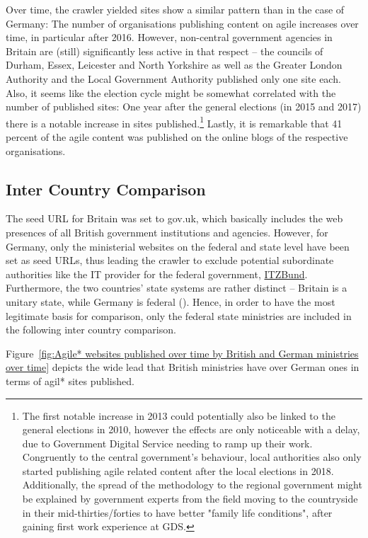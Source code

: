 Over time, the crawler yielded sites show a similar pattern than in the case of Germany: The number of organisations publishing content on agile increases over time, in particular after 2016. However, non-central government agencies in Britain are (still) significantly less active in that respect – the councils of Durham, Essex, Leicester and North Yorkshire as well as the Greater London Authority and the Local Government Authority published only one site each. Also, it seems like the election cycle might be somewhat correlated with the number of published sites: One year after the general elections (in 2015 and 2017) there is a notable increase in sites published.\footnote{The first notable increase in 2013 could potentially also be linked to the general elections in 2010, however the effects are only noticeable with a delay, due to Government Digital Service needing to ramp up their work. Congruently to the central government's behaviour, local authorities also only started publishing agile related content after the local elections in 2018. Additionally, the spread of the methodology to the regional government might be explained by government experts from the field moving to the countryside in their mid-thirties/forties to have better "family life conditions", after gaining first work experience at GDS.} Lastly, it is remarkable that 41 percent of the agile content was published on the online blogs of the respective organisations.

\subsection{Inter Country Comparison} 
The seed URL for Britain was set to gov.uk, which basically includes the web presences of all British government institutions and agencies. However, for Germany, only the ministerial websites on the federal and state level have been set as seed URLs, thus leading the crawler to exclude potential subordinate authorities like the IT provider for the federal government, \href{https://www.itzbund.de/DE/Home/home_node.html}{ITZBund}. Furthermore, the two countries' state systems are rather distinct – Britain is a unitary state, while Germany is federal (\cite{Elazar1997}). Hence, in order to have the most legitimate basis for comparison, only the federal state ministries are included in the following inter country comparison. 

\begin{wrapfigure}[10]{r}{0.5\textwidth}
	\centering
	 \texttt{[image: \{"Analysis/3\_Data\_Analysis/visualisations/british\_vs\_German\_federal\_ministries\_over\_time"]}.pdf}
	 \caption[Agile* sites published by British and German ministries over time]{Agile* sites published by British and German ministries over time}
	 \setlength{\belowcaptionskip}{-30pt}
	 \label{fig:Agile* websites published over time by British and German ministries over time}
\end{wrapfigure}
Figure~\ref{fig:Agile* websites published over time by British and German ministries over time} depicts the wide lead that British ministries have over German ones in terms of agil* sites published. 

